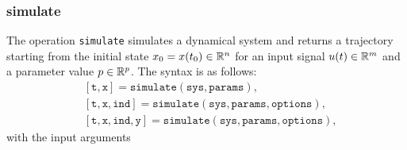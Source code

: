 \subsubsection{simulate} \label{sec:simulate}

The operation \texttt{simulate} simulates a dynamical system and returns a trajectory starting from the initial state $x_0 = x(t_0) \in \mathbb{R}^n$ for an input signal $u(t) \in \mathbb{R}^m$ and a parameter value $p \in \mathbb{R}^p$. The syntax is as follows:
\begin{equation*}
	\begin{split}
		& [\texttt{t},\texttt{x}] = \texttt{simulate}(\texttt{sys},\texttt{params}), \\
		& [\texttt{t},\texttt{x},\texttt{ind}] = \texttt{simulate}(\texttt{sys},\texttt{params},\texttt{options}), \\
		& [\texttt{t},\texttt{x},\texttt{ind},\texttt{y}] = \texttt{simulate}(\texttt{sys},\texttt{params},\texttt{options}),
	\end{split}
\end{equation*} 
with the input arguments
